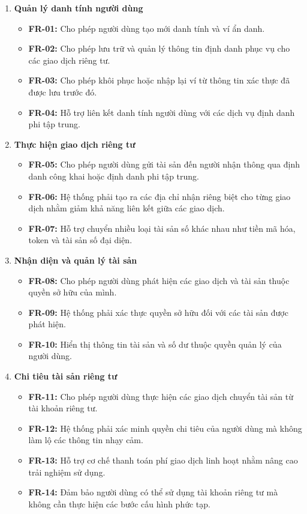 \documentclass[../DoAn.tex]{subfiles}
\begin{document}
\begin{enumerate}

\item \textbf{Quản lý danh tính người dùng}
\begin{itemize}
\item \textbf{FR-01:} Cho phép người dùng tạo mới danh tính và ví ẩn danh.
\item \textbf{FR-02:} Cho phép lưu trữ và quản lý thông tin định danh phục vụ cho các giao dịch riêng tư.
\item \textbf{FR-03:} Cho phép khôi phục hoặc nhập lại ví từ thông tin xác thực đã được lưu trước đó.
\item \textbf{FR-04:} Hỗ trợ liên kết danh tính người dùng với các dịch vụ định danh phi tập trung.
\end{itemize}

\item \textbf{Thực hiện giao dịch riêng tư}
\begin{itemize}
\item \textbf{FR-05:} Cho phép người dùng gửi tài sản đến người nhận thông qua định danh công khai hoặc định danh phi tập trung.
\item \textbf{FR-06:} Hệ thống phải tạo ra các địa chỉ nhận riêng biệt cho từng giao dịch nhằm giảm khả năng liên kết giữa các giao dịch.
\item \textbf{FR-07:} Hỗ trợ chuyển nhiều loại tài sản số khác nhau như tiền mã hóa, token và tài sản số đại diện.
\end{itemize}

\item \textbf{Nhận diện và quản lý tài sản}
\begin{itemize}
\item \textbf{FR-08:} Cho phép người dùng phát hiện các giao dịch và tài sản thuộc quyền sở hữu của mình.
\item \textbf{FR-09:} Hệ thống phải xác thực quyền sở hữu đối với các tài sản được phát hiện.
\item \textbf{FR-10:} Hiển thị thông tin tài sản và số dư thuộc quyền quản lý của người dùng.
\end{itemize}

\item \textbf{Chi tiêu tài sản riêng tư}
\begin{itemize}
\item \textbf{FR-11:} Cho phép người dùng thực hiện các giao dịch chuyển tài sản từ tài khoản riêng tư.
\item \textbf{FR-12:} Hệ thống phải xác minh quyền chi tiêu của người dùng mà không làm lộ các thông tin nhạy cảm.
\item \textbf{FR-13:} Hỗ trợ cơ chế thanh toán phí giao dịch linh hoạt nhằm nâng cao trải nghiệm sử dụng.
\item \textbf{FR-14:} Đảm bảo người dùng có thể sử dụng tài khoản riêng tư mà không cần thực hiện các bước cấu hình phức tạp.
\end{itemize}


\end{enumerate}
\end{document}
